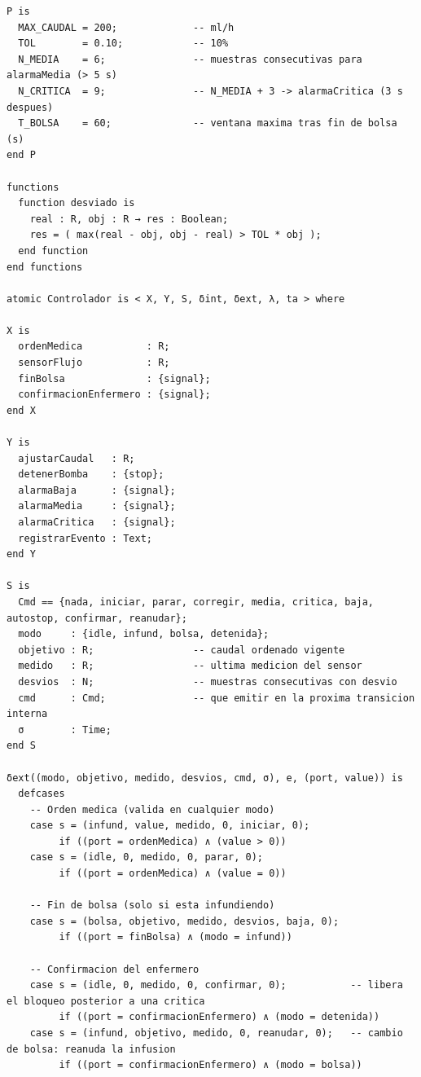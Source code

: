 \documentclass[11pt,a4paper]{article}
\begin{document}
\begin{lstlisting}[style=cml]
P is
  MAX_CAUDAL = 200;             -- ml/h
  TOL        = 0.10;            -- 10%
  N_MEDIA    = 6;               -- muestras consecutivas para alarmaMedia (> 5 s)
  N_CRITICA  = 9;               -- N_MEDIA + 3 -> alarmaCritica (3 s despues)
  T_BOLSA    = 60;              -- ventana maxima tras fin de bolsa (s)
end P

functions
  function desviado is
    real : R, obj : R → res : Boolean;
    res = ( max(real - obj, obj - real) > TOL * obj );
  end function
end functions

atomic Controlador is < X, Y, S, δint, δext, λ, ta > where

X is
  ordenMedica           : R;
  sensorFlujo           : R;
  finBolsa              : {signal};
  confirmacionEnfermero : {signal};
end X

Y is
  ajustarCaudal   : R;
  detenerBomba    : {stop};
  alarmaBaja      : {signal};
  alarmaMedia     : {signal};
  alarmaCritica   : {signal};
  registrarEvento : Text;
end Y

S is
  Cmd == {nada, iniciar, parar, corregir, media, critica, baja, autostop, confirmar, reanudar};
  modo     : {idle, infund, bolsa, detenida};
  objetivo : R;                 -- caudal ordenado vigente
  medido   : R;                 -- ultima medicion del sensor
  desvios  : N;                 -- muestras consecutivas con desvio
  cmd      : Cmd;               -- que emitir en la proxima transicion interna
  σ        : Time;
end S

δext((modo, objetivo, medido, desvios, cmd, σ), e, (port, value)) is
  defcases
    -- Orden medica (valida en cualquier modo)
    case s = (infund, value, medido, 0, iniciar, 0);
         if ((port = ordenMedica) ∧ (value > 0))
    case s = (idle, 0, medido, 0, parar, 0);
         if ((port = ordenMedica) ∧ (value = 0))

    -- Fin de bolsa (solo si esta infundiendo)
    case s = (bolsa, objetivo, medido, desvios, baja, 0);
         if ((port = finBolsa) ∧ (modo = infund))

    -- Confirmacion del enfermero
    case s = (idle, 0, medido, 0, confirmar, 0);           -- libera el bloqueo posterior a una critica
         if ((port = confirmacionEnfermero) ∧ (modo = detenida))
    case s = (infund, objetivo, medido, 0, reanudar, 0);   -- cambio de bolsa: reanuda la infusion
         if ((port = confirmacionEnfermero) ∧ (modo = bolsa))


\end{lstlisting}
\end{document}
